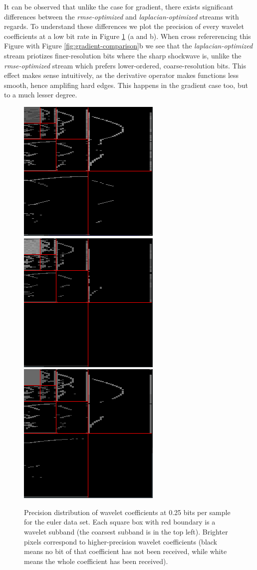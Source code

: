 It can be observed that unlike the case for gradient, there exists significant differences between
the \emph{rmse-optimized} and \emph{laplacian-optimized} streams with regards. To understand these
differences we plot the precision of every wavelet coefficients at a low bit rate in Figure
\ref{fig:laplacian-precision-comparison} (a and b). When cross refererencing this Figure with Figure
\ref{fig:gradient-comparison}b we see that the \emph{laplacian-optimized} stream priotizes
finer-resolution bits where the sharp shockwave is, unlike the \emph{rmse-optimized} stream which
prefers lower-ordered, coarse-resolution bits. This effect makes sense intuitively, as the
derivative operator makes functions less smooth, hence amplifing hard edges. This happens in the
gradient case too, but to a much lesser degree.

\begin{figure}
	\centering
	{\includegraphics[width=0.32\linewidth]{img/gradient-laplacian/euler-prec-lap.png}}
	{\includegraphics[width=0.32\linewidth]{img/gradient-laplacian/euler-prec-rmse.png}}
	{\includegraphics[width=0.32\linewidth]{img/gradient-laplacian/euler-prec-signature.png}}
	\caption{Precision distribution of wavelet coefficients at 0.25 bits per sample for the euler data
	set. Each square box with red boundary is a wavelet subband (the coarsest subband is in the top
	left). Brighter pixels correspond to higher-precision wavelet coefficients (black means no bit of
	that coefficient has not been received, while white means the whole coefficient has been
	received).}
	\label{fig:laplacian-precision-comparison}
\end{figure}

